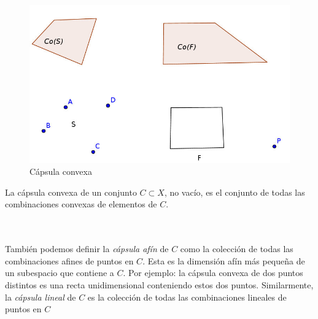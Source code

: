\begin{figure}[h]
	\centering
	\includegraphics[scale= 1.5]{./partes/capsula_conv.jpg}	
	\caption{C\'apsula convexa}\label{capsula}
\end{figure}\label{capsula}

{\proposicion La c\'apsula convexa de un conjunto $C \subset X$, no vac\'io, es el conjunto de todas las
combinaciones convexas de elementos de $C$. \label{prop1}}\\ \\

\

Tambi\'en podemos definir la {\it c\'apsula af\'in} de $C$ como la colecci\'on de todas las combinaciones afines
de puntos en $C.$ Esta es la dimensi\'on af\'in m\'as pequeña de un subespacio que contiene a $C$. Por ejemplo: 
la c\'apsula convexa de dos puntos distintos es una recta unidimensional conteniendo estos dos puntos. Similarmente,
la {\it c\'apsula lineal} de $C$ es la colecci\'on de todas las combinaciones lineales de puntos en $C$ \cite{no-lineal}

